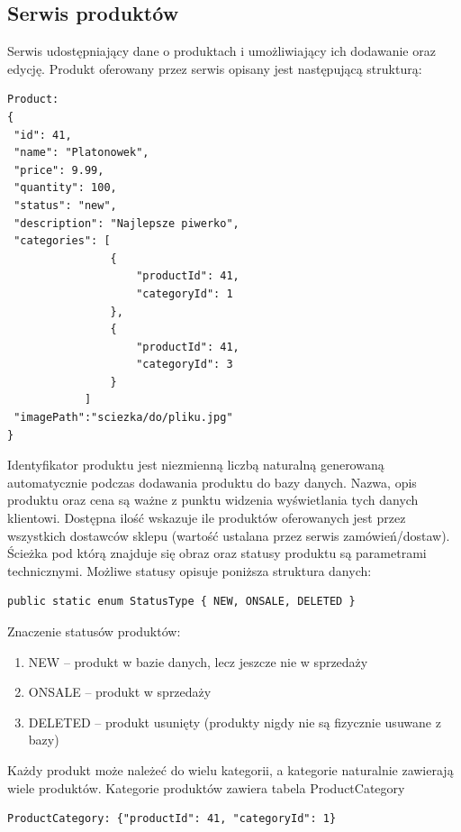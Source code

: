 \documentclass[11pt,a4paper,twoside]{article}
\begin{document}
\newpage
\subsection{Serwis produktów}
Serwis udostępniający dane o produktach i umożliwiający ich dodawanie oraz edycję. Produkt oferowany przez serwis opisany jest następującą strukturą:

\begin{lstlisting}
Product:
{
 "id": 41,
 "name": "Platonowek",
 "price": 9.99,
 "quantity": 100,
 "status": "new",
 "description": "Najlepsze piwerko",
 "categories": [
                {
                    "productId": 41,
                    "categoryId": 1
                },
                {
                    "productId": 41,
                    "categoryId": 3
                }
            ]
 "imagePath":"sciezka/do/pliku.jpg"
}
\end{lstlisting}
\vspace{-20pt}
Identyfikator produktu jest niezmienną liczbą naturalną generowaną automatycznie podczas dodawania produktu do bazy danych. Nazwa, opis produktu oraz cena są ważne z punktu widzenia wyświetlania tych danych klientowi. Dostępna ilość wskazuje ile produktów oferowanych jest przez wszystkich dostawców sklepu (wartość ustalana przez serwis zamówień/dostaw). Ścieżka pod którą znajduje się obraz oraz statusy produktu są parametrami technicznymi. Możliwe statusy opisuje poniższa struktura danych:

\begin{lstlisting}
public static enum StatusType { NEW, ONSALE, DELETED }
\end{lstlisting}
\vspace{-20pt}
Znaczenie statusów produktów:
\begin{enumerate}
\item NEW -- produkt w bazie danych, lecz jeszcze nie w sprzedaży
\item ONSALE -- produkt w sprzedaży
\item DELETED -- produkt usunięty (produkty nigdy nie są fizycznie usuwane z bazy)
\end{enumerate}

Każdy produkt może należeć do wielu kategorii, a kategorie naturalnie zawierają wiele produktów. Kategorie produktów zawiera tabela ProductCategory

\begin{lstlisting}
ProductCategory: {"productId": 41, "categoryId": 1}
\end{lstlisting}
\vspace{-20pt}
\end{document}
